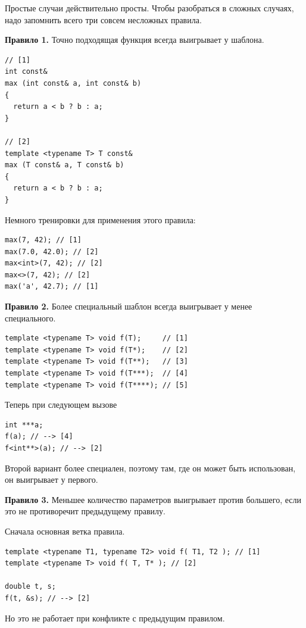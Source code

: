 \documentclass[a4paper,12pt,oneside]{article}
\begin{document}
Простые случаи действительно просты. Чтобы разобраться в сложных случаях, надо запомнить всего три совсем несложных правила.

\textbf{Правило 1.} Точно подходящая функция всегда выигрывает у шаблона.

\begin{lstlisting}
// [1]
int const& 
max (int const& a, int const& b)
{
  return a < b ? b : a; 
}

// [2]
template <typename T> T const& 
max (T const& a, T const& b)
{
  return a < b ? b : a; 
}
\end{lstlisting}

Немного тренировки для применения этого правила:

\begin{lstlisting}
max(7, 42); // [1]
max(7.0, 42.0); // [2]  
max<int>(7, 42); // [2]
max<>(7, 42); // [2]
max('a', 42.7); // [1]
\end{lstlisting}

\textbf{Правило 2.} Более специальный шаблон всегда выигрывает у менее специального.

\begin{lstlisting}
template <typename T> void f(T);     // [1]
template <typename T> void f(T*);    // [2]
template <typename T> void f(T**);   // [3]
template <typename T> void f(T***);  // [4]
template <typename T> void f(T****); // [5]
\end{lstlisting}

Теперь при следующем вызове

\begin{lstlisting}
int ***a;
f(a); // --> [4]
f<int**>(a); // --> [2] 
\end{lstlisting}

Второй вариант более специален, поэтому там, где он может быть использован, он выигрывает у первого.

\textbf{Правило 3.} Меньшее количество параметров выигрывает против большего, если это не противоречит предыдущему правилу.

Сначала основная ветка правила.

\begin{lstlisting}
template <typename T1, typename T2> void f( T1, T2 ); // [1]
template <typename T> void f( T, T* ); // [2]

double t, s;
f(t, &s); // --> [2]
\end{lstlisting}

Но это не работает при конфликте с предыдущим правилом.
\end{document}
